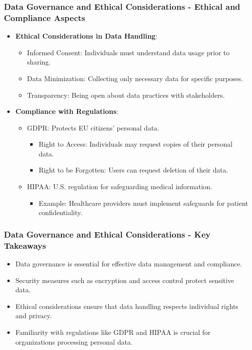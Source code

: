 \documentclass{beamer}
\begin{document}
\begin{frame}[fragile]
    \frametitle{Data Governance and Ethical Considerations - Ethical and Compliance Aspects}
    \begin{itemize}
        \item \textbf{Ethical Considerations in Data Handling}:
            \begin{itemize}
                \item Informed Consent: Individuals must understand data usage prior to sharing.
                \item Data Minimization: Collecting only necessary data for specific purposes.
                \item Transparency: Being open about data practices with stakeholders.
            \end{itemize}
        \item \textbf{Compliance with Regulations}:
            \begin{itemize}
                \item GDPR: Protects EU citizens' personal data.
                    \begin{itemize}
                        \item Right to Access: Individuals may request copies of their personal data.
                        \item Right to be Forgotten: Users can request deletion of their data.
                    \end{itemize}
                \item HIPAA: U.S. regulation for safeguarding medical information.
                    \begin{itemize}
                        \item Example: Healthcare providers must implement safeguards for patient confidentiality.
                    \end{itemize}
            \end{itemize}
    \end{itemize}
\end{frame}

\begin{frame}[fragile]
    \frametitle{Data Governance and Ethical Considerations - Key Takeaways}
    \begin{itemize}
        \item Data governance is essential for effective data management and compliance.
        \item Security measures such as encryption and access control protect sensitive data.
        \item Ethical considerations ensure that data handling respects individual rights and privacy.
        \item Familiarity with regulations like GDPR and HIPAA is crucial for organizations processing personal data.
    \end{itemize}
\end{frame}
\end{document}
